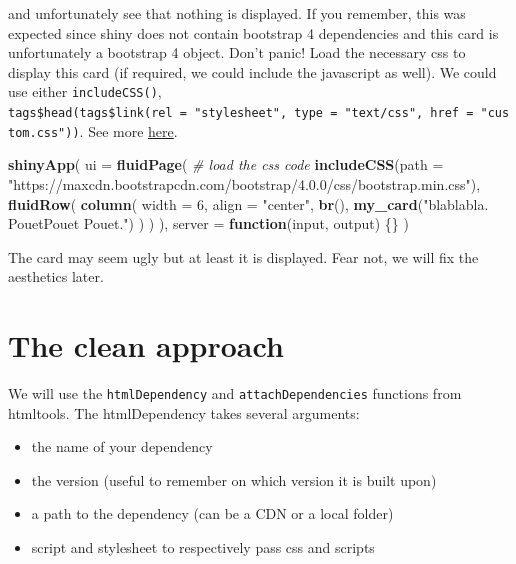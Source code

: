 \documentclass[]{book}
\newenvironment{Shaded}{\begin{snugshade}}{\end{snugshade}}
\newcommand{\CommentTok}[1]{\textcolor[rgb]{0.56,0.35,0.01}{\textit{#1}}}
\newcommand{\ControlFlowTok}[1]{\textcolor[rgb]{0.13,0.29,0.53}{\textbf{#1}}}
\newcommand{\DataTypeTok}[1]{\textcolor[rgb]{0.13,0.29,0.53}{#1}}
\newcommand{\DecValTok}[1]{\textcolor[rgb]{0.00,0.00,0.81}{#1}}
\newcommand{\KeywordTok}[1]{\textcolor[rgb]{0.13,0.29,0.53}{\textbf{#1}}}
\newcommand{\NormalTok}[1]{#1}
\newcommand{\StringTok}[1]{\textcolor[rgb]{0.31,0.60,0.02}{#1}}
\providecommand{\tightlist}{%
  \setlength{\itemsep}{0pt}\setlength{\parskip}{0pt}}
\begin{document}
and unfortunately see that nothing is displayed. If you remember, this was expected since
shiny does not contain bootstrap 4 dependencies and this card is unfortunately a
bootstrap 4 object. Don't panic! Load the necessary css to display
this card (if required, we could include the javascript as well). We could use either
\texttt{includeCSS()}, \texttt{tags\$head(tags\$link(rel\ =\ "stylesheet",\ type\ =\ "text/css",\ href\ =\ "custom.css"))}. See
more \href{https://shiny.rstudio.com/articles/css.html}{here}.

\begin{Shaded}
\begin{Highlighting}[]
\KeywordTok{shinyApp}\NormalTok{(}
  \DataTypeTok{ui =} \KeywordTok{fluidPage}\NormalTok{(}
    \CommentTok{# load the css code}
    \KeywordTok{includeCSS}\NormalTok{(}\DataTypeTok{path =} \StringTok{"https://maxcdn.bootstrapcdn.com/bootstrap/4.0.0/css/bootstrap.min.css"}\NormalTok{),}
    \KeywordTok{fluidRow}\NormalTok{(}
      \KeywordTok{column}\NormalTok{(}
        \DataTypeTok{width =} \DecValTok{6}\NormalTok{,}
        \DataTypeTok{align =} \StringTok{"center"}\NormalTok{,}
        \KeywordTok{br}\NormalTok{(),}
        \KeywordTok{my_card}\NormalTok{(}\StringTok{"blablabla. PouetPouet Pouet."}\NormalTok{)}
\NormalTok{      )}
\NormalTok{    )}
\NormalTok{  ),}
  \DataTypeTok{server =} \ControlFlowTok{function}\NormalTok{(input, output) \{\}}
\NormalTok{)}
\end{Highlighting}
\end{Shaded}

The card may seem ugly but at least it is displayed. Fear not, we will fix the aesthetics later.

\hypertarget{the-clean-approach}{%
\section{The clean approach}\label{the-clean-approach}}

We will use the \texttt{htmlDependency} and \texttt{attachDependencies} functions from htmltools.
The htmlDependency takes several arguments:

\begin{itemize}
\tightlist
\item
  the name of your dependency
\item
  the version (useful to remember on which version it is built upon)
\item
  a path to the dependency (can be a CDN or a local folder)
\item
  script and stylesheet to respectively pass css and scripts
\end{itemize}
\end{document}
